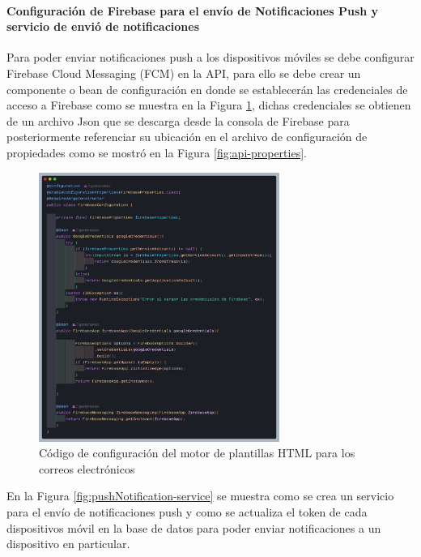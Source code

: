 \paragraph{Configuración de Firebase para el envío de Notificaciones Push y servicio de envió de notificaciones}

Para poder enviar notificaciones push a los dispositivos móviles se debe configurar Firebase Cloud Messaging (FCM) en la API, para ello se debe crear un componente o bean de configuración en donde se establecerán las credenciales de acceso a Firebase como se muestra en la Figura \ref{fig:firebase}, dichas credenciales se obtienen de un archivo Json que se descarga desde la consola de Firebase para posteriormente referenciar su ubicación en el archivo de configuración de propiedades como se mostró en la Figura \ref{fig:api-properties}.


\begin{figure}[H]
    \centering
    \includegraphics[width=0.7\textwidth]{resources/images/firebase}
    \caption{Código de configuración del motor de plantillas HTML para los correos electrónicos}
    \label{fig:firebase}
\end{figure}

En la Figura \ref{fig:pushNotification-service} se muestra como se crea un servicio para el envío de notificaciones push y como se actualiza  el token de cada dispositivos móvil en la base de datos para poder enviar notificaciones a un dispositivo en particular.

